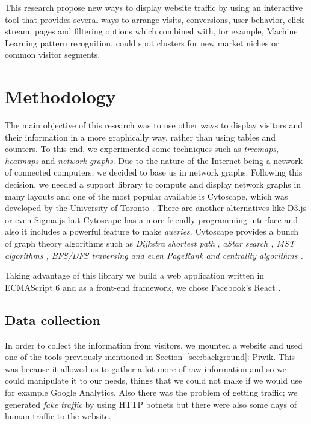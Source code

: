 \documentclass[preprint,12pt,3p]{elsarticle}
\begin{document}
This research propose new ways to display website traffic by using an interactive tool that provides several ways to arrange visits, conversions, user behavior, click stream, pages and filtering options which combined with, for example, Machine Learning pattern recognition, could spot clusters for new market niches or common visitor segments.


\section{Methodology}
\label{sec:methodology}
The main objective of this research was to use other ways to display visitors and their information in a more graphically way, rather than using tables and counters. To this end, we experimented some techniques such as \textit{treemaps}, \textit{heatmaps} and \textit{network graphs}. Due to the nature of the Internet being a network of connected computers, we decided to base us in network graphs. Following this decision, we needed a support library to compute and display network graphs in many layouts and one of the most popular available is Cytoscape, which was developed by the University of Toronto \cite{}. There are another alternatives like D3.js \cite{} or even Sigma.js \cite{} but Cytoscape has a more friendly programming interface and also it includes a powerful feature to make \textit{queries}. Cytoscape provides a bunch of graph theory algorithms such as \textit{Dijkstra shortest path} \cite{}, \textit{aStar search \cite{}, MST algorithms \cite{}, BFS/DFS traversing and even PageRank \cite{} and centrality algorithms \cite{}.}

Taking advantage of this library we build a web application written in ECMAScript 6 and as a front-end framework, we chose Facebook's React \cite{}.

\subsection{Data collection}
In order to collect the information from visitors, we mounted a website and used one of the tools previously mentioned in Section~\ref{sec:background}: Piwik. This was because it allowed us to gather a lot more of raw information and so we could manipulate it to our needs, things that we could not make if we would use for example Google Analytics. Also there was the problem of getting traffic; we generated \textit{fake traffic} by using HTTP botnets \cite{} but there were also some days of human traffic to the website.
\end{document}
